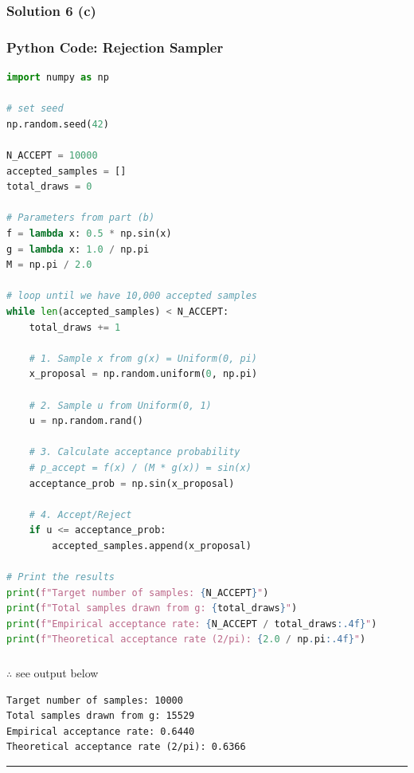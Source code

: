 \documentclass{article}
\begin{document}
\subsubsection*{Solution 6 (c)}
\subsubsection*{Python Code: Rejection Sampler}
\begin{lstlisting}[language=Python]
import numpy as np

# set seed
np.random.seed(42)

N_ACCEPT = 10000
accepted_samples = []
total_draws = 0

# Parameters from part (b)
f = lambda x: 0.5 * np.sin(x)
g = lambda x: 1.0 / np.pi
M = np.pi / 2.0

# loop until we have 10,000 accepted samples
while len(accepted_samples) < N_ACCEPT:
    total_draws += 1
    
    # 1. Sample x from g(x) = Uniform(0, pi)
    x_proposal = np.random.uniform(0, np.pi)
    
    # 2. Sample u from Uniform(0, 1)
    u = np.random.rand()
    
    # 3. Calculate acceptance probability
    # p_accept = f(x) / (M * g(x)) = sin(x)
    acceptance_prob = np.sin(x_proposal)
    
    # 4. Accept/Reject
    if u <= acceptance_prob:
        accepted_samples.append(x_proposal)

# Print the results
print(f"Target number of samples: {N_ACCEPT}")
print(f"Total samples drawn from g: {total_draws}")
print(f"Empirical acceptance rate: {N_ACCEPT / total_draws:.4f}")
print(f"Theoretical acceptance rate (2/pi): {2.0 / np.pi:.4f}")

\end{lstlisting}

\subsubsection*{\normalfont}{$\therefore$ see output below}
\begin{verbatim}
Target number of samples: 10000
Total samples drawn from g: 15529
Empirical acceptance rate: 0.6440
Theoretical acceptance rate (2/pi): 0.6366
\end{verbatim}

\noindent\rule{\textwidth}{0.4pt}\\

\newpage
\end{document}
